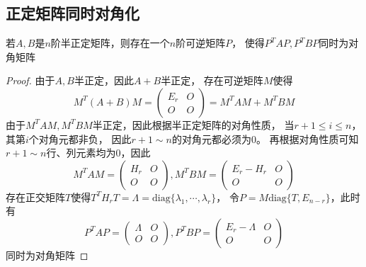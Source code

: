 \subsection{正定矩阵同时对角化}


\begin{theorem}[同时合同对角化]
  若$A,B$是$n$阶半正定矩阵，则存在一个$n$阶可逆矩阵$P$，
  使得$P^TAP, P^TBP$同时为对角矩阵
\end{theorem}

\begin{proof}
  由于$A,B$半正定，因此$A+B$半正定，
  存在可逆矩阵$M$使得
  \begin{equation*}
    M^T (A+B)M = \left(
      \begin{array}{cc}
        E_r&O \\
           O&O
      \end{array}
    \right) = M^TAM + M^TBM
  \end{equation*}
  由于$M^TAM, M^TBM$半正定，因此根据半正定矩阵的对角性质，
  当$r+1 \leq i \leq n$，
  其第$i$个对角元都非负，
  因此$r+1 \sim n$的对角元都必须为$0$。
  再根据对角性质可知$r+1 \sim n$行、列元素均为$0$，因此
  \begin{equation*}
    M^TAM = \left(
      \begin{array}{cc}
        H_r&O \\
           O&O
      \end{array}
    \right),
    M^T BM = \left(
      \begin{array}{cc}
        E_r - H_r&O \\
                 O&O
      \end{array}
    \right)
  \end{equation*}
  存在正交矩阵$T$使得$T^TH_rT = \Lambda = \mathrm{diag}\{\lambda_1,\cdots,\lambda_r\}$，
  令$P = M \mathrm{diag}\{T,E_{n-r}\}$，此时有
  \begin{equation*}
    P^TAP = \left(
      \begin{array}{cc}
        \Lambda&O \\
              O&O
      \end{array}
    \right),
    P^TBP = \left(
      \begin{array}{cc}
        E_r - \Lambda&O \\
                    O&O
      \end{array}
    \right)
  \end{equation*}
  同时为对角矩阵
\end{proof}


